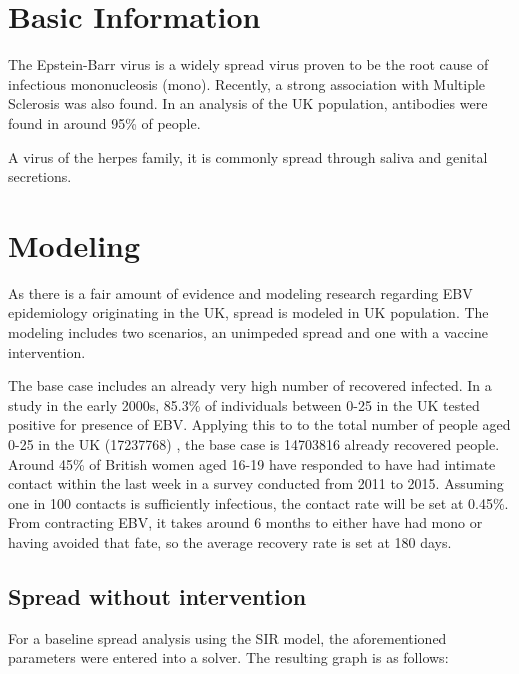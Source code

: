 \documentclass[12pt]{article}
\begin{document}
\maketitle

\section{Basic Information}

The Epstein-Barr virus is a widely spread virus proven to be the root cause of
infectious mononucleosis (mono). Recently, a strong association with Multiple Sclerosis
was also found.\cite{EBVMSSurvey} In an analysis of the UK population, antibodies were found in around 95\% 
of people.\cite{EBVSurvey}

A virus of the herpes family, it is commonly spread through saliva and genital secretions.

\section{Modeling}

As there is a fair amount of evidence and modeling research regarding EBV epidemiology
originating in the UK, spread is modeled in UK population. The modeling
includes two scenarios, an unimpeded spread and one with a vaccine intervention. 

The base case includes an already very high number of recovered infected. In a study in the early 2000s, 85.3\% of individuals between 0-25 in the UK tested
positive for presence of EBV. \cite{ebvprevalence} Applying this to to the total number of people aged 0-25 in the UK (17237768) \cite{census}, the base case is 14703816 already recovered people.
Around 45\% of British women aged 16-19 have responded to have had intimate contact within the last week in a survey conducted from 2011 to 2015. \cite{rate} Assuming one in 100 contacts
is sufficiently infectious, the contact rate will be set at 0.45\%. From contracting EBV, it takes around 6 months to either have had mono or having avoided that fate, so the average recovery rate is set at 180 days.

\clearpage
\subsection{Spread without intervention}

For a baseline spread analysis using the SIR model, the aforementioned parameters were entered into a solver. The resulting graph is as follows:
\end{document}
